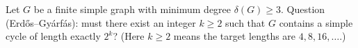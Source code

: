 Let $G$ be a finite simple graph with minimum degree $\delta(G)\ge 3$.
Question (Erd\H{o}s--Gy\'{a}rf\'{a}s): must there exist an integer $k\ge2$ such that $G$ contains a simple cycle of 
length exactly $2^k$?
(Here $k\ge2$ means the target lengths are $4,8,16,\dots$.)
